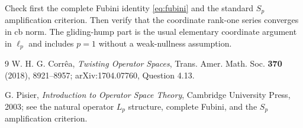 \documentclass[11pt]{article}
\begin{document}
Check first the complete Fubini identity \eqref{eq:fubini} and the standard
$S_p$ amplification criterion. Then verify that the coordinate rank-one
series converges in cb norm. The gliding-hump part is the usual elementary
coordinate argument in $\ell_p$ and includes $p=1$ without a weak-nullness
assumption.

\begin{thebibliography}{9}
W. H. G. Corr\^ea,
\emph{Twisting Operator Spaces}, Trans. Amer. Math. Soc. \textbf{370}
(2018), 8921--8957; arXiv:1704.07760, Question 4.13.

G. Pisier,
\emph{Introduction to Operator Space Theory}, Cambridge University Press,
2003; see the natural operator $L_p$ structure, complete Fubini, and the
$S_p$ amplification criterion.
\end{thebibliography}
\end{document}
